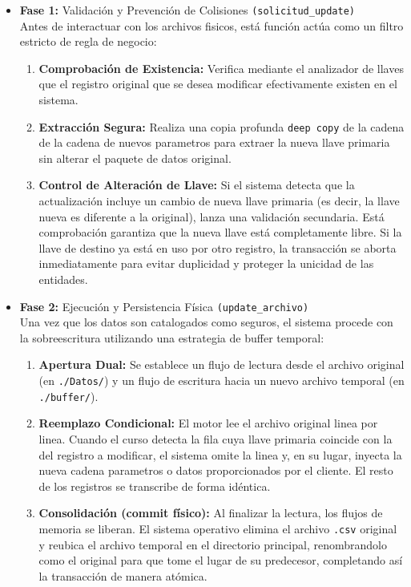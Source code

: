 \documentclass[12pt]{article}
\begin{document}
\begin{itemize}
    \item \textbf{Fase 1:} Validación y Prevención de Colisiones \texttt{(solicitud\_update)} \\
    Antes de interactuar con los archivos fisicos, está función actúa como un filtro estricto de regla de negocio:
    \begin{enumerate}
        \item \textbf{Comprobación de Existencia:} Verifica mediante el analizador de llaves que el registro original que se desea modificar efectivamente existen en el sistema.
        \item \textbf{Extracción Segura:} Realiza una copia profunda \texttt{deep copy} de la cadena de la cadena de nuevos parametros para extraer la nueva llave primaria sin alterar el paquete de datos original.
        \item \textbf{Control de Alteración de Llave:} Si el sistema detecta que la actualización incluye un cambio de nueva llave primaria (es decir, la llave nueva es diferente a la original), lanza una validación secundaria. Está comprobación garantiza que la nueva llave está completamente libre. Si la llave de destino ya está en uso por otro registro, la transacción se aborta inmediatamente para evitar duplicidad y proteger la unicidad de las entidades.
    \end{enumerate}
    \item \textbf{Fase 2:} Ejecución y Persistencia Física \texttt{(update\_archivo)}\\
    Una vez que los datos son catalogados como seguros, el sistema procede con la sobreescritura utilizando una estrategia de buffer temporal:
    \begin{enumerate}
        \item \textbf{Apertura Dual:} Se establece un flujo de lectura desde el archivo original (en \texttt{./Datos/}) y un flujo de escritura hacia un nuevo archivo temporal (en \texttt{./buffer/}).
        \item \textbf{Reemplazo Condicional:} El motor lee el archivo original linea por linea. Cuando el curso detecta la fila cuya llave primaria coincide con la del registro a modificar, el sistema omite la linea y, en su lugar, inyecta la nueva cadena parametros o datos proporcionados por el cliente. El resto de los registros se transcribe de forma idéntica.
        \item \textbf{Consolidación (commit físico):} Al finalizar la lectura, los flujos de memoria se liberan. El sistema operativo elimina el archivo \texttt{.csv} original y reubica el archivo temporal en el directorio principal, renombrandolo como el original para que tome el lugar de su predecesor, completando así la transacción de manera atómica. 
    \end{enumerate}
\end{itemize}
\end{document}
